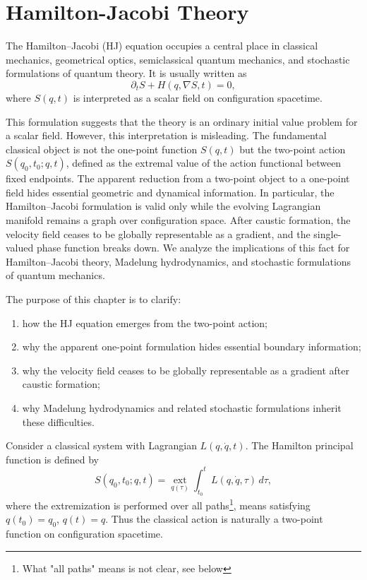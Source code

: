 \chapter{Hamilton-Jacobi Theory}
\label{ch:hj}

The Hamilton--Jacobi (HJ) equation occupies a central place in classical
mechanics, geometrical optics, semiclassical quantum mechanics, and stochastic
formulations of quantum theory. It is usually written as
\begin{equation}
\partial_t S + H(q,\nabla S,t)=0,
\label{hj:hjeq}
\end{equation}
where $S(q,t)$ is interpreted as a scalar field on configuration spacetime.

This formulation suggests that the theory is an ordinary initial value problem
for a scalar field. However, this interpretation is misleading. The fundamental
classical object is not the one-point function $S(q,t)$ but the two-point
action $S(q_0,t_0;q,t)$, defined as the extremal value of the action functional
between fixed endpoints.
 The apparent reduction from a
two-point object to a one-point field hides essential geometric and dynamical
information. In particular, the Hamilton--Jacobi formulation is valid only
while the evolving Lagrangian manifold remains a graph over configuration
space. After caustic formation, the velocity field ceases to be globally
representable as a gradient, and the single-valued phase function breaks down.
We analyze the implications of this fact for Hamilton--Jacobi theory, Madelung
hydrodynamics, and stochastic formulations of quantum mechanics.

The purpose of this chapter is to clarify:
\begin{enumerate}
\item how the HJ equation emerges from the two-point action;
\item why the apparent one-point formulation hides essential boundary
    information;
\item why the velocity field ceases to be globally representable as a gradient
    after caustic formation;
\item why Madelung hydrodynamics and related stochastic formulations inherit
    these difficulties.
\end{enumerate}

Consider a classical system with Lagrangian
$L(q,\dot q,t)$.
The Hamilton principal function is defined by
\begin{equation}
S(q_0,t_0;q,t)=\operatorname*{ext}_{q(\tau)}
\int_{t_0}^{t} L(q,\dot q,\tau)\,d\tau,
\label{hj:principal}
\end{equation}
where the extremization is performed over all paths\footnote{What "all paths" 
means is not clear, see below}, means satisfying
$q(t_0)=q_0$, $q(t)=q$.
Thus the classical action is naturally a two-point function on configuration 
spacetime.


